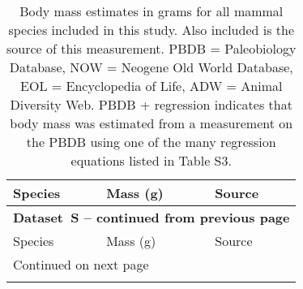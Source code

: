 \documentclass{article}
\renewcommand{\thetable}{S\arabic{table}}
\renewcommand{\tablename}{Dataset}
\begin{document}
\small
\begin{center}
  \begin{longtable}{p{} p{} p{}}
    \caption[Mammal body mass estimates]{Body mass estimates in grams for all mammal species included in this study. Also included is the source of this measurement. PBDB = Paleobiology Database, NOW = Neogene Old World Database, EOL = Encyclopedia of Life, ADW = Animal Diversity Web. PBDB + regression indicates that body mass was estimated from a measurement on the PBDB using one of the many regression equations listed in Table S3.} \label{tab:mass_data} \\

    \hline Species & Mass (g) & Source \\ \hline
    \endfirsthead

    \multicolumn{3}{p{\textwidth}}{{ \bfseries \tablename\ \thetable{} -- continued from previous page}} \\
    \hline Species & Mass (g) & Source \\ \hline
    \endhead

    \hline \multicolumn{3}{p{\textwidth}}{{Continued on next page}} \\ \hline
    \endfoot


\end{longtable}
\end{center}
\end{document}
